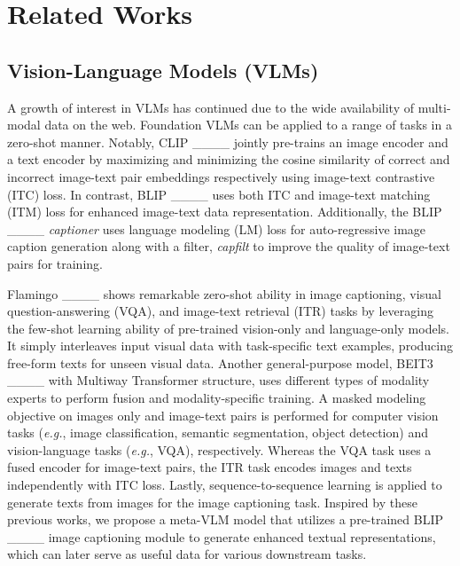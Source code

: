 \section{Related Works}
\subsection{Vision-Language Models (VLMs)}
A growth of interest in VLMs has continued due to the wide availability of multi-modal data on the web. Foundation VLMs can be applied to a range of tasks in a zero-shot manner. Notably, CLIP ____ jointly pre-trains an image encoder and a text encoder by maximizing and minimizing the cosine similarity of correct and incorrect image-text pair embeddings respectively using image-text contrastive (ITC) loss. In contrast, BLIP ____ uses both ITC and image-text matching (ITM) loss for enhanced image-text data representation. Additionally, the BLIP ____ \textit{captioner} uses language modeling (LM) loss for auto-regressive image caption generation along with a filter, \textit{capfilt} to improve the quality of image-text pairs for training.  

Flamingo ____ shows remarkable zero-shot ability in image captioning, visual question-answering (VQA), and image-text retrieval (ITR) tasks by leveraging the few-shot learning ability of pre-trained vision-only and language-only models. It simply interleaves input visual data with task-specific text examples, producing free-form texts for unseen visual data. Another general-purpose model, BEIT3 ____ with Multiway Transformer structure, uses different types of modality experts to perform fusion and modality-specific training. A masked modeling objective on images only and image-text pairs is performed for computer vision tasks (\textit{e.g.}, image classification, semantic segmentation, object detection) and vision-language tasks (\textit{e.g.}, VQA), respectively. Whereas the VQA task uses a fused encoder for image-text pairs, the ITR task encodes images and texts independently with ITC loss. Lastly, sequence-to-sequence learning is applied to generate texts from images for the image captioning task. Inspired by these previous works, we propose a meta-VLM model that utilizes a pre-trained BLIP ____ image captioning module to generate enhanced textual representations, which can later serve as useful data for various downstream tasks.

